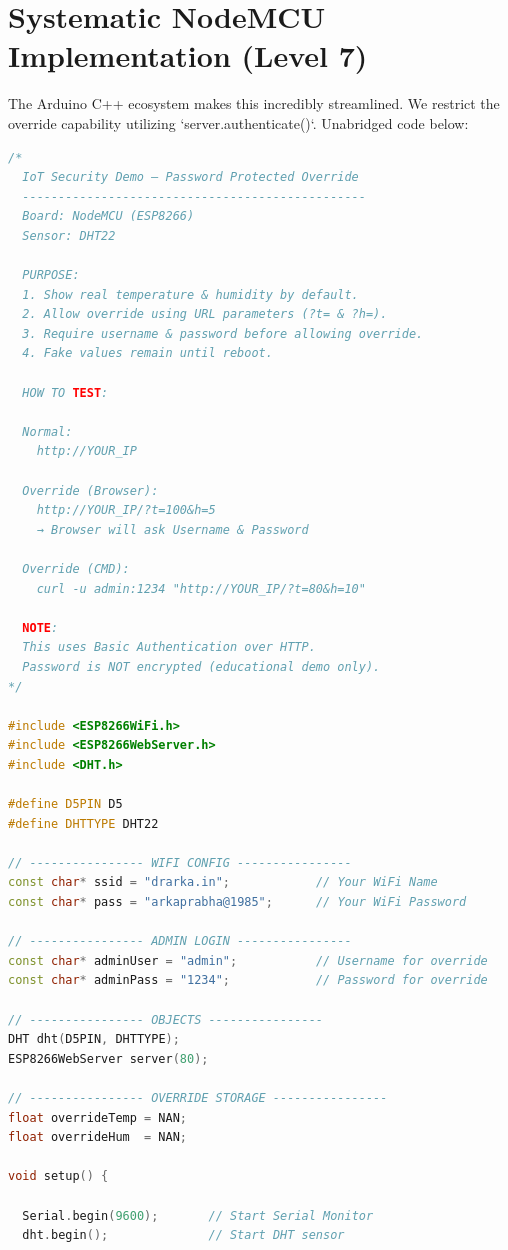 \section{Systematic NodeMCU Implementation (Level 7)}
The Arduino C++ ecosystem makes this incredibly streamlined. We restrict the override capability utilizing `server.authenticate()`. Unabridged code below:

\begin{lstlisting}[language=C++, caption=23022026\_Level\_7\_IoT\_Secure\_Override\_Demo.ino]
/*
  IoT Security Demo – Password Protected Override
  ------------------------------------------------
  Board: NodeMCU (ESP8266)
  Sensor: DHT22

  PURPOSE:
  1. Show real temperature & humidity by default.
  2. Allow override using URL parameters (?t= & ?h=).
  3. Require username & password before allowing override.
  4. Fake values remain until reboot.

  HOW TO TEST:

  Normal:
    http://YOUR_IP

  Override (Browser):
    http://YOUR_IP/?t=100&h=5
    → Browser will ask Username & Password

  Override (CMD):
    curl -u admin:1234 "http://YOUR_IP/?t=80&h=10"

  NOTE:
  This uses Basic Authentication over HTTP.
  Password is NOT encrypted (educational demo only).
*/

#include <ESP8266WiFi.h>
#include <ESP8266WebServer.h>
#include <DHT.h>

#define D5PIN D5
#define DHTTYPE DHT22

// ---------------- WIFI CONFIG ----------------
const char* ssid = "drarka.in";            // Your WiFi Name
const char* pass = "arkaprabha@1985";      // Your WiFi Password

// ---------------- ADMIN LOGIN ----------------
const char* adminUser = "admin";           // Username for override
const char* adminPass = "1234";            // Password for override

// ---------------- OBJECTS ----------------
DHT dht(D5PIN, DHTTYPE);
ESP8266WebServer server(80);

// ---------------- OVERRIDE STORAGE ----------------
float overrideTemp = NAN;
float overrideHum  = NAN;

void setup() {

  Serial.begin(9600);       // Start Serial Monitor
  dht.begin();              // Start DHT sensor


\end{lstlisting}
